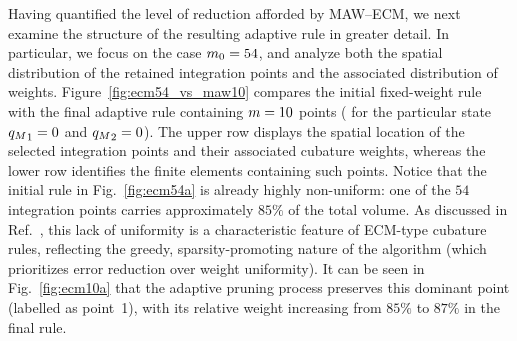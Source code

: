 \documentclass[preprint,10pt]{elsarticle}  %
\newtheorem{remark}{Remark}
\begin{document}
Having quantified the level of reduction afforded by MAW--ECM, we next examine the structure of the resulting adaptive rule in greater detail. In particular, we focus on the case $m_0=54$, and analyze both the spatial distribution of the retained integration points and the associated distribution of weights.
Figure~\ref{fig:ecm54_vs_maw10} compares the initial fixed-weight rule   with the final adaptive rule containing $m=10$ points (  for the particular state ${q_{M}}_1=0$ and ${q_{M}}_2=0$). The upper row displays the spatial location of the selected integration points and their associated cubature weights, whereas the lower row identifies the finite elements containing such points. Notice that the initial rule in Fig.~\ref{fig:ecm54a} is already highly non-uniform: one of the $54$ integration points carries approximately $85\%$ of the total volume. As discussed in Ref.~\cite{hernandez2024cecm}, this lack of uniformity is a characteristic feature of ECM-type cubature rules, reflecting the greedy, sparsity-promoting nature of the algorithm (which prioritizes error reduction over weight uniformity). It can be seen in Fig.~\ref{fig:ecm10a} that the adaptive pruning process preserves this dominant point (labelled as point~1), with its relative weight   increasing from $85\%$ to $87\%$ in the final rule.



%
%
%
\end{document}
